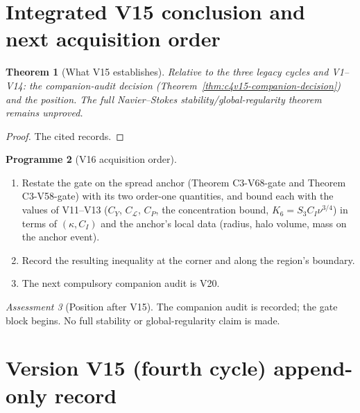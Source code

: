 \documentclass[11pt]{article}
\theoremstyle{plain}
\newtheorem{theorem}{Theorem}[section]
\theoremstyle{definition}
\newtheorem{programme}[theorem]{Programme}
\theoremstyle{remark}
\newtheorem{assessment}[theorem]{Assessment}
\begin{document}
\section{Integrated V15 conclusion and next acquisition order}
\label{sec:c4v15-conclusion}

\begin{theorem}[What V15 establishes]
\label{thm:c4v15-conclusion}
Relative to the three legacy cycles and V1--V14: the companion-audit
decision (Theorem~\ref{thm:c4v15-companion-decision}) and the position.
The full Navier--Stokes stability/global-regularity theorem remains
unproved.
\end{theorem}

\begin{proof}
The cited records.
\end{proof}

\begin{programme}[V16 acquisition order]
\label{prog:c4v16}
\begin{enumerate}[label=\textup{(AC\arabic*)},leftmargin=4.8em]
\item Restate the gate on the spread anchor (Theorem C3-V68-gate and
      Theorem C3-V58-gate) with its two order-one quantities, and
      bound each with the values of V11--V13 (\(C_Y\), \(C_{\mathcal L}\), \(C_P\), the
      concentration bound, \(K_6=S_3C_I\nu^{3/4}\)) in terms of \((\kappa,C_I)\) and the
      anchor's local data (radius, halo volume, mass on the anchor
      event).
\item Record the resulting inequality at the corner and along the
      region's boundary.
\item The next compulsory companion audit is V20.
\end{enumerate}
\end{programme}

\begin{assessment}[Position after V15]
\label{ass:c4v15-position}
The companion audit is recorded; the gate block begins.  No full
stability or global-regularity claim is made.
\end{assessment}

\section*{Version V15 (fourth cycle) append-only record}
\end{document}
